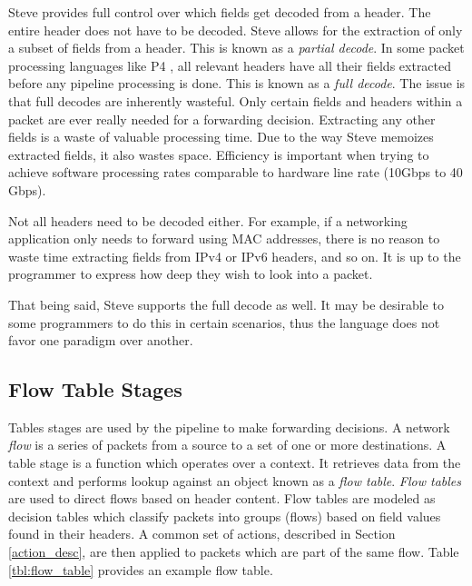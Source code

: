 Steve provides full control over which fields get decoded
from a header. The entire header does not have to be decoded.
Steve allows for the extraction of only a subset of fields from a header. 
This is known as a \emph{partial decode}.
In some packet processing languages like P4 \cite{p4_spec, p4_spec2}, all
relevant headers have all their fields extracted before any pipeline processing
is done. 
This is known as a \emph{full decode}.
The issue is that full decodes are inherently wasteful.
Only certain fields and headers within a packet are ever really needed for a
forwarding decision.
Extracting any other fields is a waste of valuable processing time.
Due to the way Steve memoizes extracted fields, it also wastes space.
Efficiency is important when trying
to achieve software processing rates comparable to hardware line rate 
(10Gbps to 40 Gbps).

Not all headers need to be decoded either. For
example, if a networking application only needs to forward using MAC addresses,
there is no reason to waste time extracting fields from IPv4 or IPv6 headers,
and so on. It is up to the programmer to express how deep they wish to look into
a packet.

That being said, Steve supports the full decode as well. It may be desirable to
some programmers to do this in certain scenarios, thus the language does not
favor one paradigm over another.

\subsection{Flow Table Stages} \label{table_desc}

Tables stages are used by the pipeline to make forwarding decisions.
A network \emph{flow} is a series of packets from a source to a set of one or
more destinations.
A table stage is a function which operates over a context. It retrieves data from the context and performs lookup against an object known as a \emph{flow table}.
\emph{Flow tables} are used to direct
flows \cite{openflow_spec} based on header content. 
Flow tables are modeled as decision tables which classify packets into
groups (flows) based on field values found in their headers. 
A common set of actions, described in Section \ref{action_desc}, are then applied to packets which are part of the same flow.
Table \ref{tbl:flow_table} provides an example flow table.

